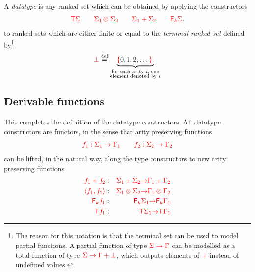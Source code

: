 \begin{definition}[Datatypes] \label{def:types} A \emph{datatype} is any ranked set which can be obtained by applying the constructors 
    \begin{align*}
    {\color{red}{{\color{red}{\mathsf T}}{\color{red}{\Sigma}}\qquad {\color{red}{\Sigma}}_1 \otimes {\color{red}{\Sigma}}_2 \qquad {\color{red}{\Sigma}}_1 + {\color{red}{\Sigma}}_2 \qquad {\color{red}{\mathsf F_{k}}}{\color{red}{\Sigma}}}},
    \end{align*}
    to ranked sets which are either finite or equal to the \emph{terminal ranked set}  defined by\footnote{The reason for this notation is that the terminal set can be used to model partial functions. A partial function of type  ${\color{red}{ \Sigma \to \Gamma}}$ can be modelled as a total function of type ${\color{red}{\Sigma \to \Gamma + {\color{red}{\bot}}}}$, which outputs elements of ${\color{red}{\bot}}$ instead of  undefined values.
    }
    \begin{align*}
    {\color{red}{\bot}} \stackrel{\text{def}}=  \underbrace{{\color{red}{\{}}0, 1, 2,\ldots {\color{red}{\}}}.}_{\substack{\text{for each arity $i$, one} \\ \text{element denoted by $i$}}}
    \end{align*}
\end{definition}


\subsection{Derivable functions}
\smallskip
\newcommand{\funcitem}[3]{\ranked{#1  } &:& \ranked{#2} \rto  \ranked{#3}}
This completes the definition of the datatype constructors. 
All datatype constructors are functors, in the sense  that  arity preserving functions
\begin{align*}
{\color{red}{f_1 : \Sigma_1 \to \Gamma_1 \qquad f_2 : \Sigma_2 \to \Gamma_2}}
\end{align*}       
can be lifted, in the natural way, along the type constructors to new arity preserving  functions
\begin{eqnarray}
\label{eq:liftplus}\funcitem{f_1 + f_2}{\Sigma_1 + \Sigma_2}{\Gamma_1 + \Gamma_2} \\
\funcitem{\tensorpair{f_1,f_2}}{\Sigma_1 \otimes \Sigma_2}{\Gamma_1 \otimes \Gamma_2}\\
\funcitem{\reduce k f_1}{\reduce k \Sigma_1}{\reduce k \Gamma_1}\\
\label{eq:liftterm}
\funcitem{\tmonad f_1}{\tmonad \Sigma_1}{\tmonad \Gamma_1}
\end{eqnarray}

